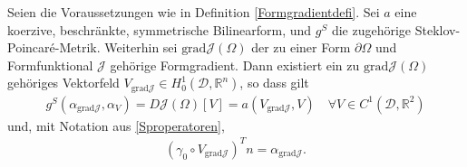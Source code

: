 \begin{theorem}
Seien die Voraussetzungen wie in Definition \ref{Formgradientdefi}. Sei $a$ eine koerzive, beschränkte, symmetrische Bilinearform, und $g^S$ die zugehörige Steklov-Poincaré-Metrik. Weiterhin sei $\text{grad}\mathcal{J}(\Omega)$ der zu einer Form $\partial\Omega$ und Formfunktional $\mathcal{J}$ gehörige Formgradient. Dann existiert ein zu $\text{grad}\mathcal{J}(\Omega)$ gehöriges Vektorfeld $V_{\text{grad}\mathcal{J}} \in H^1_0(\mathcal{D}, \mathbb{R}^n)$, so dass gilt
\begin{equation}
\label{zentraleDeformation}
\begin{aligned}
	g^S(\alpha_{\text{grad}\mathcal{J}}, \alpha_V) = D\mathcal{J}(\Omega)[V] = a(V_{\text{grad}\mathcal{J}},V) \quad \forall  V \in C^1(\mathcal{D},\mathbb{R}^2)
\end{aligned}
\end{equation}
und, mit Notation aus \ref{Sproperatoren},
\begin{align*}
	(\gamma_0\circ V_{\text{grad}\mathcal{J}})^T n = \alpha_{\text{grad}\mathcal{J}}.
\end{align*}
\end{theorem}

